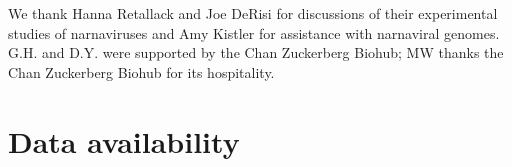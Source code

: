 \documentclass[unnumsec,webpdf,contemporary,large,namedate]{oup-authoring-template}%
\theoremstyle{thmstyleone}%
\theoremstyle{thmstyletwo}%
\theoremstyle{thmstylethree}%
\begin{document}
We thank Hanna Retallack and Joe DeRisi for discussions of their experimental studies of narnaviruses
and Amy Kistler for assistance with narnaviral genomes.
G.H. and D.Y. were supported by the Chan Zuckerberg Biohub;
MW thanks the Chan Zuckerberg Biohub for its hospitality. 

\section{Data availability}






%
%
\end{document}

